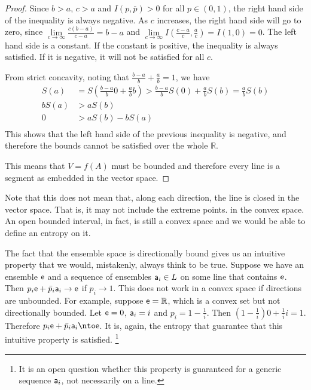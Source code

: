 \begin{mathSection}
\begin{proof}
	Since $b > a$, $c > a$ and $I(p,\bar{p}) > 0$ for all $p \in (0,1)$, the right hand side of the inequality is always negative. As $c$ increases, the right hand side will go to zero, since $\lim\limits_{c\to \infty}\frac{c(b-a)}{c-a} = b-a$ and $\lim\limits_{c\to \infty} I\left(\frac{c-a}{c}, \frac{a}{c}\right) = I(1,0) = 0$. The left hand side is a constant. If the constant is positive, the inequality is always satisfied. If it is negative, it will not be satisfied for all $c$.
	
	From strict concavity, noting that $\frac{b-a}{b} + \frac{a}{b} = 1$, we have
	\begin{equation}
		\begin{aligned}
			S(a) &= S\left(\frac{b-a}{b} 0 + \frac{a}{b} b\right) > \frac{b-a}{b} S(0) + \frac{a}{b} S(b) = \frac{a}{b} S(b)\\
			b S(a) &> a S(b)  \\
			0 &> a S(b) - b S(a)\\
		\end{aligned}
	\end{equation}
	This shows that the left hand side of the previous inequality is negative, and therefore the bounds cannot be satisfied over the whole $\mathbb{R}$.
	
	This means that $V = f(A)$ must be bounded and therefore every line is a segment as embedded in the vector space.
\end{proof}

\begin{remark}
	Note that this does not mean that, along each direction, the line is closed in the vector space. That is, it may not include the extreme points. in the convex space. An open bounded interval, in fact, is still a convex space and we would be able to define an entropy on it.
\end{remark}
\end{mathSection}

The fact that the ensemble space is directionally bound gives us an intuitive property that we would, mistakenly, always think to be true. Suppose we have an ensemble $\ens$ and a sequence of ensembles $\ens[a]_i \in L$ on some line that contains $\ens$. Then $p_i \ens + \bar{p}_i \ens[a]_i \to \ens$ if $p_i \to 1$. This does not work in a convex space if directions are unbounded. For example, suppose $\ens = \mathbb{R}$, which is a convex set but not directionally bounded. Let $\ens = 0$, $\ens[a]_i = i$ and $p_i = 1 - \frac{1}{i}$. Then $\left(1 - \frac{1}{i}\right) 0 + \frac{1}{i}{i} = 1$. Therefore $p_i \ens + \bar{p}_i \ens[a]_i \nto \ens$. It is, again, the entropy that guarantee that this intuitive property is satisfied. \footnote{It is an open question whether this property is guaranteed for a generic sequence $\ens[a]_i$, not necessarily on a line.}

